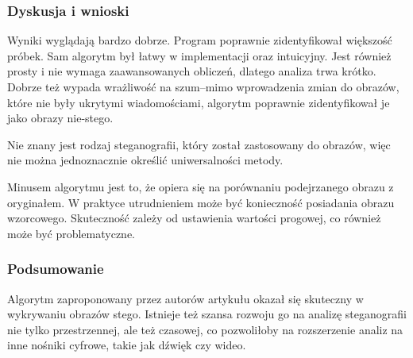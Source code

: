 \pagebreak

\subsubsection{Dyskusja i wnioski}
Wyniki wyglądają bardzo dobrze. Program poprawnie zidentyfikował większość próbek. Sam algorytm był łatwy w
implementacji oraz intuicyjny. Jest również prosty i nie wymaga zaawansowanych obliczeń, dlatego analiza trwa
krótko.
Dobrze też wypada wrażliwość na szum--mimo wprowadzenia zmian do obrazów, które nie były ukrytymi
wiadomościami, algorytm poprawnie zidentyfikował je jako obrazy nie-stego.

Nie znany jest rodzaj steganografii, który został zastosowany do obrazów, więc nie można jednoznacznie określić
uniwersalności metody.

Minusem algorytmu jest to, że opiera się na porównaniu podejrzanego obrazu z oryginałem. W praktyce utrudnieniem
może być konieczność posiadania obrazu wzorcowego. Skuteczność zależy od ustawienia wartości progowej, co
również może być problematyczne.

\subsubsection{Podsumowanie}
Algorytm zaproponowany przez autorów artykułu okazał się skuteczny w wykrywaniu obrazów stego. Istnieje też
szansa rozwoju go na analizę steganografii nie tylko przestrzennej, ale też czasowej, co pozwoliłoby na rozszerzenie
analiz na inne nośniki cyfrowe, takie jak dźwięk czy wideo.
